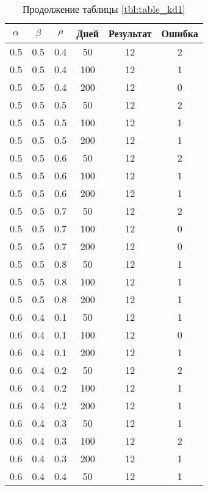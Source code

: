 \begin{table}[h]
	\begin{center}
        \captionsetup{justification=raggedright,singlelinecheck=off}
		\caption*{Продолжение таблицы \ref{tbl:table_kd1}}
		\begin{tabular}{|c|c|c|c|c|c|}
  	\hline
	$\alpha$ & $\beta$ & $\rho$ & Дней & Результат & Ошибка \\\hline
 
	0.5 &  0.5 &  0.4 &   50 &    12 &     2 \\
	0.5 &  0.5 &  0.4 &  100 &    12 &     1 \\
	0.5 &  0.5 &  0.4 &  200 &    12 &     0 \\
   \hline
	0.5 &  0.5 &  0.5 &   50 &    12 &     2 \\
	0.5 &  0.5 &  0.5 &  100 &    12 &     1 \\
	0.5 &  0.5 &  0.5 &  200 &    12 &     1 \\
   \hline
	0.5 &  0.5 &  0.6 &   50 &    12 &     2 \\
	0.5 &  0.5 &  0.6 &  100 &    12 &     1 \\
	0.5 &  0.5 &  0.6 &  200 &    12 &     1 \\
   \hline
	0.5 &  0.5 &  0.7 &   50 &    12 &     2 \\
	0.5 &  0.5 &  0.7 &  100 &    12 &     0 \\
	0.5 &  0.5 &  0.7 &  200 &    12 &     0 \\
   \hline
	0.5 &  0.5 &  0.8 &   50 &    12 &     1 \\
	0.5 &  0.5 &  0.8 &  100 &    12 &     1 \\
	0.5 &  0.5 &  0.8 &  200 &    12 &     1 \\
   \hline
	0.6 &  0.4 &  0.1 &   50 &    12 &     1 \\
	0.6 &  0.4 &  0.1 &  100 &    12 &     0 \\
	0.6 &  0.4 &  0.1 &  200 &    12 &     1 \\
   \hline
	0.6 &  0.4 &  0.2 &   50 &    12 &     2 \\
	0.6 &  0.4 &  0.2 &  100 &    12 &     1 \\
	0.6 &  0.4 &  0.2 &  200 &    12 &     1 \\
   \hline
	0.6 &  0.4 &  0.3 &   50 &    12 &     1 \\
	0.6 &  0.4 &  0.3 &  100 &    12 &     2 \\
	0.6 &  0.4 &  0.3 &  200 &    12 &     1 \\
   \hline
	0.6 &  0.4 &  0.4 &   50 &    12 &     1 \\

\end{tabular}
\end{center}
\end{table}
